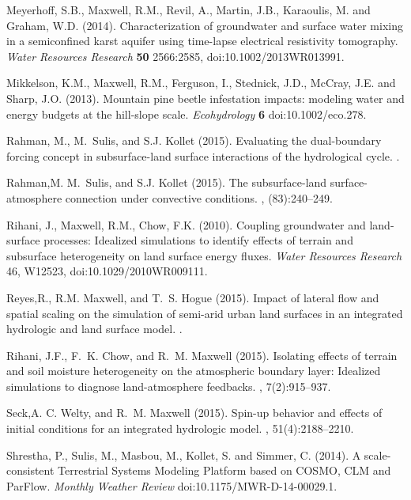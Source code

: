\begin{thebibliography}{999}
Meyerhoff, S.B., Maxwell, R.M., Revil, A., Martin, J.B., Karaoulis, M. and Graham, W.D. (2014). Characterization of groundwater and surface water mixing in a semiconfined karst aquifer using time-lapse electrical resistivity tomography. {\em Water Resources Research} {\bf 50} 2566:2585, doi:10.1002/2013WR013991.

Mikkelson, K.M., Maxwell, R.M., Ferguson, I., Stednick, J.D., McCray, J.E. and Sharp, J.O. (2013). Mountain pine beetle infestation impacts: modeling water and energy budgets at the hill-slope scale. {\em Ecohydrology} {\bf 6} doi:10.1002/eco.278.


Rahman, M., M.~Sulis, and S.J. Kollet (2015).
\newblock Evaluating the dual-boundary forcing concept in subsurface-land
  surface interactions of the hydrological cycle.
.

Rahman,M. M.~Sulis, and S.J. Kollet (2015).
\newblock The subsurface-land surface-atmosphere connection under convective
  conditions.
, (83):240--249.


Rihani, J., Maxwell, R.M., Chow, F.K. (2010). Coupling groundwater and land-surface processes: Idealized simulations to identify effects of terrain and subsurface heterogeneity on land surface energy fluxes. {\em Water Resources Research} 46, W12523, doi:10.1029/2010WR009111.

Reyes,R., R.M. Maxwell, and T.~S. Hogue (2015).
\newblock Impact of lateral flow and spatial scaling on the simulation of
  semi-arid urban land surfaces in an integrated hydrologic and land surface
  model.
.

Rihani, J.F., F.~K. Chow, and R.~M. Maxwell (2015).
\newblock Isolating effects of terrain and soil moisture heterogeneity on the
  atmospheric boundary layer: Idealized simulations to diagnose land-atmosphere
  feedbacks.
, 7(2):915--937.

Seck,A. C. Welty, and R.~M. Maxwell (2015).
\newblock Spin-up behavior and effects of initial conditions for an integrated
  hydrologic model.
, 51(4):2188--2210.


Shrestha, P., Sulis, M., Masbou, M., Kollet, S. and Simmer, C. (2014). A scale-consistent Terrestrial Systems Modeling Platform based on COSMO, CLM and ParFlow. {\em Monthly Weather Review} doi:10.1175/MWR-D-14-00029.1.


\end{thebibliography}

